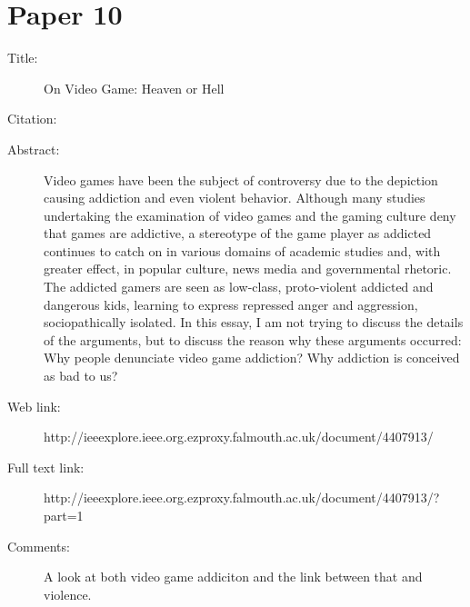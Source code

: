 \documentclass{scrartcl}
\begin{document}
\section*{Paper 10}
\begin{description}
\item[Title:] On Video Game: Heaven or Hell
\item[Citation:] \cite{heavenhell}
\item[Abstract:] Video games have been the subject of controversy due to the depiction causing addiction and even violent behavior. Although many studies undertaking the examination of video games and the gaming culture deny that games are addictive, a stereotype of the game player as addicted continues to catch on in various domains of academic studies and, with greater effect, in popular culture, news media and governmental rhetoric. The addicted gamers are seen as low-class, proto-violent addicted and dangerous kids, learning to express repressed anger and aggression, sociopathically isolated. In this essay, I am not trying to discuss the details of the arguments, but to discuss the reason why these arguments occurred: Why people denunciate video game addiction? Why addiction is conceived as bad to us?
\item[Web link:] http://ieeexplore.ieee.org.ezproxy.falmouth.ac.uk/document/4407913/
\item[Full text link:] http://ieeexplore.ieee.org.ezproxy.falmouth.ac.uk/document/4407913/?part=1
\item[Comments:]  A look at both video game addiciton and the link between that and violence. 
\end{description}
\end{document}
